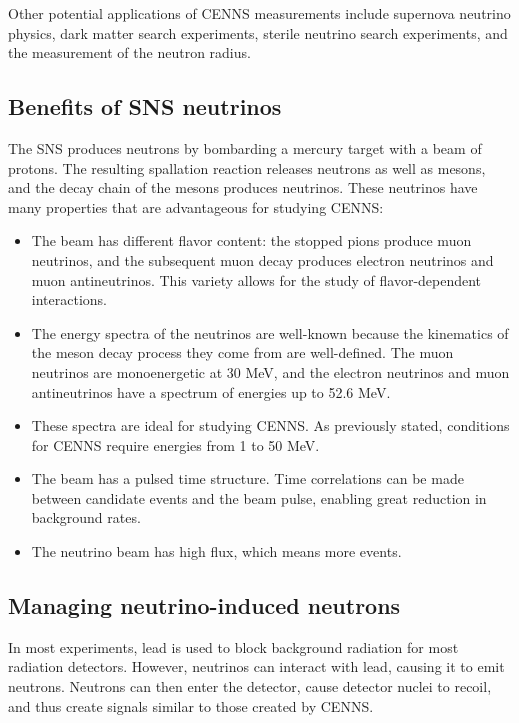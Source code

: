 \documentclass[12pt]{article}
\begin{document}
Other potential applications of CENNS measurements include supernova neutrino physics, dark matter search experiments, sterile neutrino search experiments, and the measurement of the neutron radius.

\subsection{Benefits of SNS neutrinos \cite{CSI}}

The SNS produces neutrons by bombarding a mercury target with a beam of protons. The resulting spallation reaction releases neutrons as well as mesons, and the decay chain of the mesons produces neutrinos. These neutrinos have many properties that are advantageous for studying CENNS:
\begin{itemize}
  \item The beam has different flavor content: the stopped pions produce muon neutrinos, and the subsequent muon decay produces electron neutrinos and muon antineutrinos. This variety allows for the study of flavor-dependent interactions.
  \item The energy spectra of the neutrinos are well-known because the kinematics of the meson decay process they come from are well-defined. The muon neutrinos are monoenergetic at 30 MeV, and the electron neutrinos and muon antineutrinos have a spectrum of energies up to 52.6 MeV. 
  \item These spectra are ideal for studying CENNS. As previously stated, conditions for CENNS require energies from 1 to 50 MeV.
  \item The beam has a pulsed time structure. Time correlations can be made between candidate events and the beam pulse, enabling great reduction in background rates.
  \item The neutrino beam has high flux, which means more events.
\end{itemize}

\subsection{Managing neutrino-induced neutrons}

In most experiments, lead is used to block background radiation for most radiation detectors. However, neutrinos can interact with lead, causing it to emit neutrons. Neutrons can then enter the detector, cause detector nuclei to recoil, and thus create signals similar to those created by CENNS.
\end{document}
